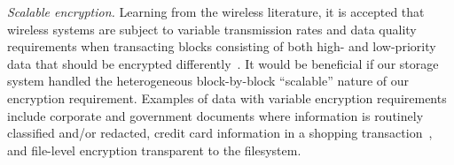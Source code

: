 {\em Scalable encryption.} Learning from the wireless literature, it is accepted
that wireless systems are subject to variable transmission rates and data
quality requirements when transacting blocks consisting of both high- and
low-priority data that should be encrypted differently~\cite{ScalableSecurity}.
It would be beneficial if our storage system handled the heterogeneous
block-by-block ``scalable'' nature of our encryption requirement. Examples of
data with variable encryption requirements include corporate and government
documents where information is routinely classified and/or redacted, credit card
information in a shopping transaction~\cite{ScalableSecurity}, and file-level
encryption transparent to the filesystem.
